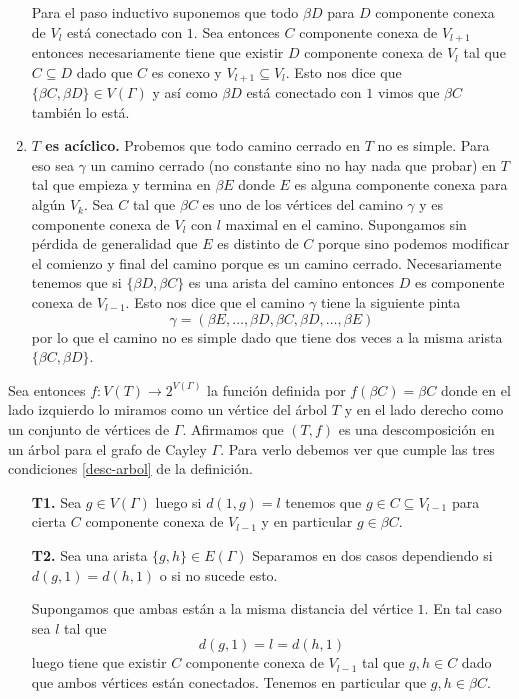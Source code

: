 \documentclass[tesis.tex]{subfiles}
\begin{document}
\begin{obs}
\begin{enumerate}[$\bullet$]
		Para el paso inductivo suponemos que todo $\beta D$ para $D$ componente conexa de $V_{l}$ está conectado con $1$.
		Sea entonces $C$ componente conexa de $V_{l+1}$ entonces necesariamente tiene que existir $D$ componente conexa de $V_{l}$ tal que $C \subseteq D$ dado que $C$ es conexo y $V_{l+1} \subseteq V_{l}$.
		Esto nos dice que $\{ \beta C, \beta D \} \in V(\Gamma)$ y así como $\beta D$ está conectado con $1$ vimos que $\beta C$ también lo está.
		
		\item \textbf{$T$ es acíclico.}
		Probemos que todo camino cerrado en $T$ no es simple.
		Para eso sea $\gamma$ un camino cerrado (no constante sino no hay nada que probar) en $T$ tal que empieza y termina en $\beta E$ donde $E$ es alguna componente conexa para algún $V_{k}$.
		Sea $C$ tal que $\beta C$ es uno de los vértices del camino $\gamma$ y es componente conexa de $V_{l}$ con $l$ maximal en el camino.
		Supongamos sin pérdida de generalidad que $E$ es distinto de $C$ porque sino podemos modificar el comienzo y final del camino porque es un camino cerrado.
		Necesariamente tenemos que si $\{ \beta D, \beta C \}$ es una arista del camino entonces $D$ es componente conexa de $V_{l-1}$.
		Esto nos dice que el camino $\gamma$ tiene la siguiente pinta
		\[
			\gamma = (\beta E, \dots, \beta D, \beta C, \beta D, \dots, \beta E)
		\]
		por lo que el camino no es simple dado que tiene dos veces a la misma arista $\{ \beta C, \beta D \}$.
		
	\end{enumerate}
	  
	Sea entonces $f: V(T) \to 2^{V(\Gamma)}$ la función definida por $f(\beta C) = \beta C$ donde en el lado izquierdo lo miramos como un vértice del árbol $T$ y en el lado derecho como un conjunto de vértices de $\Gamma$.
	Afirmamos que $(T,f)$ es una descomposición en un árbol para el grafo de Cayley $\Gamma$.
	Para verlo debemos ver que cumple las tres condiciones \ref{desc-arbol} de la definición. 
	\begin{enumerate}
		\item[\textbf{T1.}] Sea $g \in V(\Gamma)$ luego si $d(1,g) = l$
		tenemos que $g \in C \subseteq V_{l-1}$ para cierta $C$ componente conexa de $V_{l-1}$ y en particular $g \in \beta C$.		 
		
		
		\item[\textbf{T2.}] Sea una arista $\{g,h\} \in E(\Gamma)$ 
		Separamos en dos casos dependiendo si $d(g,1) = d(h,1)$ o si no sucede esto.
		
		Supongamos que ambas están a la misma distancia del vértice $1$. 
		En tal caso sea $l$ tal que 
		\[
			d(g,1)= l = d(h,1)
		\] 
		luego tiene que existir $C$ componente conexa de $V_{l-1}$ 
		tal que $g,h \in C$ dado que ambos vértices están conectados.
		Tenemos en particular que $g,h \in \beta C$.
		

\end{enumerate}
\end{obs}
\end{document}
